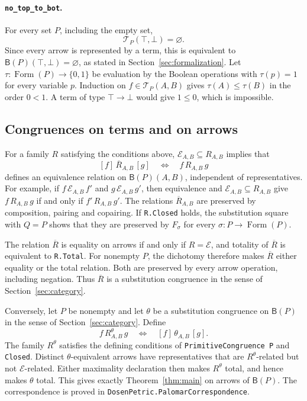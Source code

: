 \documentclass[11pt]{article}
\newcommand{\B}{\mathsf B}
\newcommand{\FormulaSet}{\operatorname{Form}}
\begin{document}
\paragraph{\texttt{no\_top\_to\_bot}.}
For every set $P$, including the empty set,
\[
 \mathcal T_P(\top,\bot)=\varnothing.
\]
Since every arrow is represented by a term, this is equivalent to
$\B(P)(\top,\bot)=\varnothing$, as stated in
Section~\ref{sec:formalization}.
Let $\tau:\FormulaSet(P)\to\{0,1\}$ be evaluation by the Boolean
operations with $\tau(p)=1$ for every variable $p$.
Induction on $f\in\mathcal T_P(A,B)$ gives $\tau(A)\leq\tau(B)$
in the order $0<1$. A term of type
$\top\to\bot$ would give $1\leq0$, which is impossible.

\subsection{Congruences on terms and on arrows}

For a family $R$ satisfying the conditions above,
$\mathcal E_{A,B}\subseteq R_{A,B}$ implies that
\[
 [f]\,\overline R_{A,B}\,[g]
 \quad\Longleftrightarrow\quad f\,R_{A,B}\,g
\]
defines an equivalence relation on $\B(P)(A,B)$, independent of
representatives. For example, if
$f\,\mathcal E_{A,B}\,f'$ and $g\,\mathcal E_{A,B}\,g'$, then
equivalence and $\mathcal E_{A,B}\subseteq R_{A,B}$ give
$f\,R_{A,B}\,g$ if and only if $f'\,R_{A,B}\,g'$.
The relations $\overline R_{A,B}$ are preserved by composition,
pairing and copairing. If \texttt{R.Closed} holds, the substitution
square with $Q=P$ shows that they are preserved by $F_\sigma$ for
every $\sigma:P\to\FormulaSet(P)$.

The relation $\overline R$ is equality on arrows if and only if
$R=\mathcal E$, and totality of $\overline R$ is equivalent to
\texttt{R.Total}. For nonempty $P$, the dichotomy therefore makes
$\overline R$ either equality or the total relation. Both are preserved
by every arrow operation, including negation. Thus $\overline R$ is a
substitution congruence in the sense of Section~\ref{sec:category}.

Conversely, let $P$ be nonempty and let $\theta$ be a substitution
congruence on $\B(P)$ in the sense of Section~\ref{sec:category}.
Define
\[
 f\,R^\theta_{A,B}\,g
 \quad\Longleftrightarrow\quad [f]\,\theta_{A,B}\,[g].
\]
The family $R^\theta$ satisfies the defining conditions of
\texttt{PrimitiveCongruence P} and \texttt{Closed}.
Distinct $\theta$-equivalent arrows have representatives that are
$R^\theta$-related but not $\mathcal E$-related. Either maximality
declaration then makes $R^\theta$ total, and hence makes $\theta$ total.
This gives exactly Theorem~\ref{thm:main} on arrows of $\B(P)$.
The correspondence is proved in
\texttt{DosenPetric.PalomarCorrespondence}.
\end{document}
